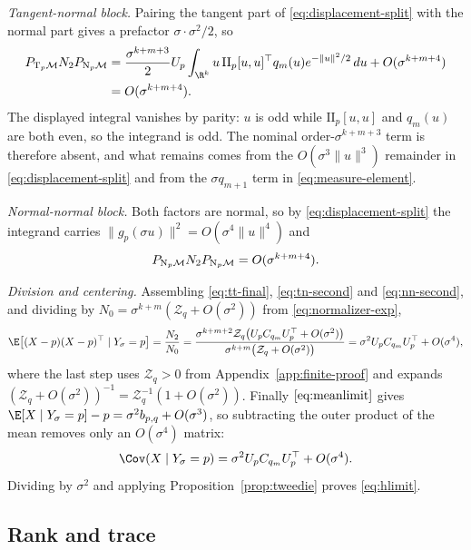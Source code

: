 \emph{Tangent-normal block.}  Pairing the tangent part of
\eqref{eq:displacement-split} with the normal part gives a prefactor
$\sigma\cdot\sigma^2/2$, so
\begin{align}
  P_{\T_p\M}N_2P_{\N_p\M}
  &=\frac{\sigma^{k+m+3}}{2}U_p
    \int_{\R^k}u\,\mathrm{II}_p[u,u]^\top q_m(u)e^{-\|u\|^2/2}\,du
    +O(\sigma^{k+m+4})\nonumber\\
  &=O(\sigma^{k+m+4}).
  \label{eq:tn-second}
\end{align}
The displayed integral vanishes by parity: $u$ is odd while
$\mathrm{II}_p[u,u]$ and $q_m(u)$ are both even, so the integrand is odd.  The
nominal order-$\sigma^{k+m+3}$ term is therefore absent, and what remains comes
from the $O(\sigma^3\|u\|^3)$ remainder in \eqref{eq:displacement-split} and from
the $\sigma q_{m+1}$ term in \eqref{eq:measure-element}.

\emph{Normal-normal block.}  Both factors are normal, so by
\eqref{eq:displacement-split} the integrand carries $\|g_p(\sigma u)\|^2
=O(\sigma^4\|u\|^4)$ and
\begin{equation}
  P_{\mathrm{N}_p\mathcal{M}}N_2P_{\mathrm{N}_p\mathcal{M}}=O(\sigma^{k+m+4}).
  \label{eq:nn-second}
\end{equation}

\emph{Division and centering.}  Assembling \eqref{eq:tt-final},
\eqref{eq:tn-second} and \eqref{eq:nn-second}, and dividing by
$N_0=\sigma^{k+m}(\mathcal Z_q+O(\sigma^2))$ from \eqref{eq:normalizer-exp},
\begin{equation}
  \E\bigl[(X-p)(X-p)^\top\mid Y_\sigma=p\bigr]
  =\frac{N_2}{N_0}
  =\frac{\sigma^{k+m+2}\mathcal Z_q\bigl(U_pC_{q_m}U_p^\top+O(\sigma^2)\bigr)}
        {\sigma^{k+m}\bigl(\mathcal Z_q+O(\sigma^2)\bigr)}
  =\sigma^2U_pC_{q_m}U_p^\top+O(\sigma^4),
  \label{eq:second-moment-final}
\end{equation}
where the last step uses $\mathcal Z_q>0$ from Appendix~\ref{app:finite-proof}
and expands $(\mathcal Z_q+O(\sigma^2))^{-1}=\mathcal Z_q^{-1}(1+O(\sigma^2))$.
Finally $\eqref{eq:meanlimit}$ gives
$\E[X\mid Y_\sigma=p]-p=\sigma^2b_{p,q}+O(\sigma^3)$, so subtracting the outer
product of the mean removes only an $O(\sigma^4)$ matrix:
\begin{equation}
  \Cov(X\mid Y_\sigma=p)
  =\sigma^2U_pC_{q_m}U_p^\top+O(\sigma^4).
  \label{eq:cov-final}
\end{equation}
Dividing by $\sigma^2$ and applying Proposition~\ref{prop:tweedie} proves
\eqref{eq:hlimit}.

\subsection{Rank and trace}

